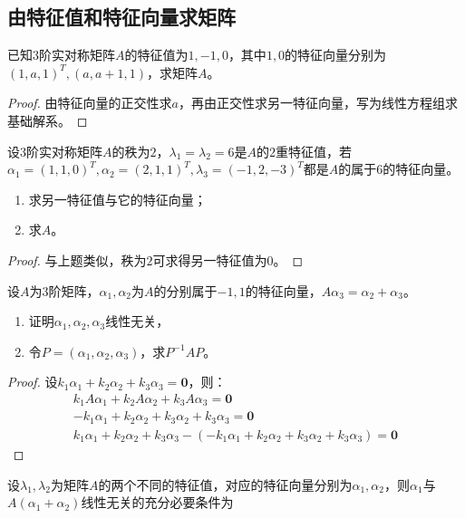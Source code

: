 \subsection{由特征值和特征向量求矩阵}
\begin{theorem}
	已知$3$阶实对称矩阵$A$的特征值为$1,-1,0$，其中$1,0$的特征向量分别为$(1,a,1)^T,(a,a+1,1)$，求矩阵$A$。
\end{theorem}
\begin{proof}
	由特征向量的正交性求$a$，再由正交性求另一特征向量，写为线性方程组求基础解系。
\end{proof}
\begin{theorem}
	设$3$阶实对称矩阵$A$的秩为$2$，$\lambda_1=\lambda_2=6$是$A$的$2$重特征值，若$\alpha_1=(1,1,0)^T,\alpha_2=(2,1,1)^T,\lambda_3=(-1,2,-3)^T$都是$A$的属于$6$的特征向量。
	\begin{enumerate}
		\item 求另一特征值与它的特征向量；
		\item 求$A$。
	\end{enumerate}
\end{theorem}
\begin{proof}
	与上题类似，秩为$2$可求得另一特征值为$0$。
\end{proof}
\begin{theorem}
	设$A$为$3$阶矩阵，$\alpha_1,\alpha_2$为$A$的分别属于$-1,1$的特征向量，$A\alpha_3=\alpha_2+\alpha_3$。
	\begin{enumerate}
		\item 证明$\alpha_1,\alpha_2,\alpha_3$线性无关，
		\item 令$P=(\alpha_1,\alpha_2,\alpha_3)$，求$P^{-1}AP$。
	\end{enumerate}
\end{theorem}
\begin{proof}
	设$k_1\alpha_1+k_2\alpha_2+k_3\alpha_3=\mathbf{0}$，则：
	\begin{gather*}
		k_1A\alpha_1+k_2A\alpha_2+k_3A\alpha_3=\mathbf{0} \\
		-k_1\alpha_1+k_2\alpha_2+k_3\alpha_2+k_3\alpha_3=\mathbf{0} \\
		k_1\alpha_1+k_2\alpha_2+k_3\alpha_3-(-k_1\alpha_1+k_2\alpha_2+k_3\alpha_2+k_3\alpha_3)=\mathbf{0}
	\end{gather*}
\end{proof}
\begin{theorem}
	设$\lambda_1,\lambda_2$为矩阵$A$的两个不同的特征值，对应的特征向量分别为$\alpha_1,\alpha_2$，则$\alpha_1$与$A(\alpha_1+\alpha_2)$线性无关的充分必要条件为
\end{theorem}

